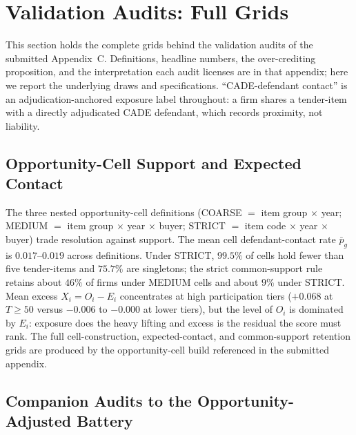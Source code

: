 \section{Validation Audits: Full Grids}
\label{supp:validation}

This section holds the complete grids behind the validation audits of
the submitted Appendix~C. Definitions, headline numbers, the
over-crediting proposition, and the interpretation each audit licenses
are in that appendix; here we report the underlying draws and
specifications. ``CADE-defendant contact'' is an adjudication-anchored
exposure label throughout: a firm shares a tender-item with a directly
adjudicated CADE defendant, which records proximity, not liability.

\subsection{Opportunity-Cell Support and Expected Contact}
\label{supp:opp_cells}

The three nested opportunity-cell definitions (COARSE $=$ item group
$\times$ year; MEDIUM $=$ item group $\times$ year $\times$ buyer; STRICT
$=$ item code $\times$ year $\times$ buyer) trade resolution against
support. The mean cell defendant-contact rate $\bar p_g$ is
$0.017$--$0.019$ across definitions. Under STRICT, $99.5\%$ of cells hold
fewer than five tender-items and $75.7\%$ are singletons; the strict
common-support rule retains about $46\%$ of firms under MEDIUM cells and
about $9\%$ under STRICT. Mean excess $X_i = O_i - E_i$ concentrates at
high participation tiers ($+0.068$ at $T\ge 50$ versus $-0.006$ to
$-0.000$ at lower tiers), but the level of $O_i$ is dominated by $E_i$:
exposure does the heavy lifting and excess is the residual the score
must rank. The full cell-construction, expected-contact, and
common-support retention grids are produced by the opportunity-cell
build referenced in the submitted appendix.

\subsection{Companion Audits to the Opportunity-Adjusted Battery}
\label{supp:perm_matched}

